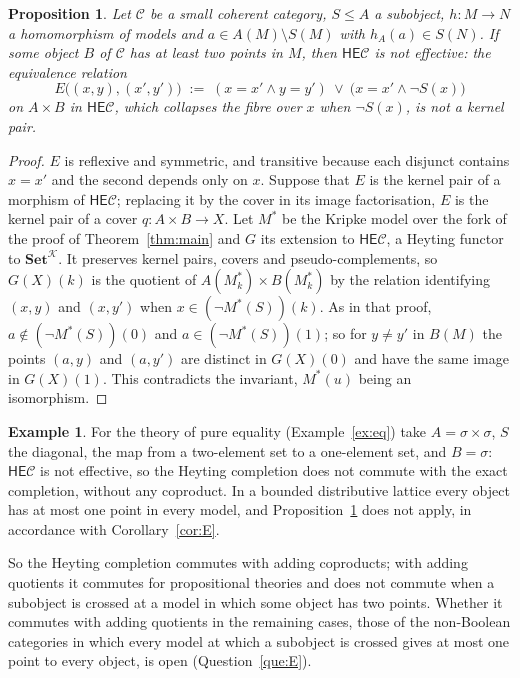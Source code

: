 \documentclass[11pt]{amsart}
\newtheorem{prop}[thm]{Proposition}
\theoremstyle{definition}
\newtheorem{ex}[thm]{Example}
\newcommand{\Set}{\mathbf{Set}}
\newcommand{\EE}{\mathsf E}
\newcommand{\HH}{\mathsf H}
\newcommand{\cC}{\mathcal C}
\newcommand{\cK}{\mathcal K}
\begin{document}
\begin{prop}\label{prop:E}
Let $\cC$ be a small coherent category, $S\le A$ a subobject,
$h\colon M\to N$ a homomorphism of models and $a\in A(M)\setminus S(M)$
with $h_A(a)\in S(N)$. If some object $B$ of $\cC$ has at least two
points in $M$, then $\HH\EE\cC$ is not effective: the equivalence
relation
\[
E\big((x,y),(x',y')\big)\;:=\;(x=x'\wedge y=y')\ \vee\ \big(x=x'\wedge
\neg S(x)\big)
\]
on $A\times B$ in $\HH\EE\cC$, which collapses the fibre over $x$ when
$\neg S(x)$, is not a kernel pair.
\end{prop}
\begin{proof}
$E$ is reflexive and symmetric, and transitive because each disjunct
contains $x=x'$ and the second depends only on $x$. Suppose that $E$ is
the kernel pair of a morphism of $\HH\EE\cC$; replacing it by the cover
in its image factorisation, $E$ is the kernel pair of a cover $q\colon
A\times B\to X$. Let $M^\ast$ be the Kripke model over the fork of the
proof of Theorem~\ref{thm:main} and $G$ its extension to $\HH\EE\cC$, a
Heyting functor to $\Set^{\cK}$. It preserves kernel pairs, covers and
pseudo-complements, so $G(X)(k)$ is the quotient of $A(M^\ast_k)\times
B(M^\ast_k)$ by the relation identifying $(x,y)$ and $(x,y')$ when
$x\in(\neg M^\ast(S))(k)$. As in that proof, $a\notin(\neg M^\ast(S))
(0)$ and $a\in(\neg M^\ast(S))(1)$; so for $y\ne y'$ in $B(M)$ the
points $(a,y)$ and $(a,y')$ are distinct in $G(X)(0)$ and have the same
image in $G(X)(1)$. This contradicts the invariant, $M^\ast(u)$ being
an isomorphism.
\end{proof}

\begin{ex}
For the theory of pure equality (Example~\ref{ex:eq}) take $A=\sigma
\times\sigma$, $S$ the diagonal, the map from a two-element set to a
one-element set, and $B=\sigma$: $\HH\EE\cC$ is not effective, so the Heyting completion does not
commute with the exact completion, without any coproduct. In a bounded
distributive lattice every object has at most one point in every
model, and Proposition~\ref{prop:E} does not apply, in accordance with
Corollary~\ref{cor:E}.
\end{ex}

So the Heyting completion commutes with adding coproducts; with adding
quotients it commutes for propositional theories and does not commute
when a subobject is crossed at a model in which some object has two
points. Whether it commutes with adding quotients in the remaining
cases, those of the non-Boolean categories in which every model at
which a subobject is crossed gives at most one point to every object,
is open (Question~\ref{que:E}).
\end{document}
